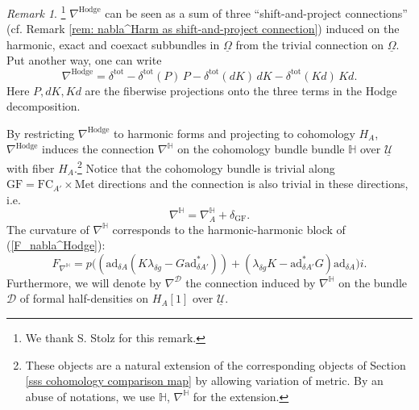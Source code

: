 \documentclass[11pt,a4paper]{amsart}
\theoremstyle{plain} %
\theoremstyle{definition}
\theoremstyle{remark}
\newtheorem{rem}[thm]{Remark}
\newcommand{\HH}{\mathbb{H}}
\newcommand{\mr}{\mathrm}
\newcommand{\mc}{\mathcal}
\newcommand{\ad}{\mathrm{ad}}
\newcommand{\FC}{\mathrm{FC}}
\newcommand{\UU}{\underline{\mc{U}}}
\newcommand{\ul}{\underline}
\begin{document}
{%
\begin{rem}\footnote{We thank S. Stolz for 
this remark. 
}
    $\nabla^\mr{Hodge}$ can be seen as a sum of three ``shift-and-project connections'' (cf. Remark \ref{rem: nabla^Harm as shift-and-project connection}) induced on the harmonic, exact and coexact subbundles in $\ul\Omega$ from the trivial connection on $\ul\Omega$. Put another way, one can write
    \begin{equation}
        \nabla^\mr{Hodge}=\delta^\mr{tot}-\delta^\mr{tot} (P)\, P-
        \delta^\mr{tot}(dK)\, dK - \delta^\mr{tot}(Kd)\, Kd.
    \end{equation}
    Here $P,dK,Kd$ are the fiberwise projections onto the three terms in the Hodge decomposition.
\end{rem}


By restricting $\nabla^\mr{Hodge}$ to harmonic forms and projecting to cohomology $H_A$, $\nabla^\mr{Hodge}$ induces the connection $\nabla^\mathbb{H}$ on the cohomology bundle bundle  $\HH$ over $\UU$ with fiber $H_A$.\footnote{
These objects are a natural extension of the corresponding objects of Section
\ref{sss cohomology comparison map} by allowing variation of metric. By an abuse of notations, we use $\mathbb{H}$, $\nabla^\mathbb{H}$ for the extension.} 
Notice that the cohomology bundle is trivial along $\mr{GF} = \FC_{A'} \times \mr{Met}$  directions and the connection is also trivial in these directions, i.e. 
\begin{equation}
 \nabla^\HH = \nabla^\HH_{A} + \delta_{\mr{GF}}.
\end{equation} %
The curvature of $\nabla^\mathbb{H}$ corresponds to the harmonic-harmonic block of (\ref{F_nabla^Hodge}):
\begin{equation}\label{F_nabla^H}
    F_{\nabla^\mathbb{H}}=p\Big((\ad_{\delta A}(K\lambda_{\delta g}-G\ad^*_{\delta A'}))+
    (\lambda_{\delta g} K-\ad^*_{\delta A'}G)\ad_{\delta A}\Big)i.
\end{equation}
Furthermore, we will denote by $\nabla^\mc{D}$ the connection induced by $\nabla^\HH$ on the bundle $\mc{D}$ of formal half-densities on $H_A{ [1]}$ over $\UU$.

}
\end{document}
